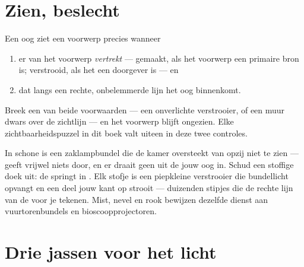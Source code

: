 \section{Zien, beslecht}

\begin{proposition}\label{prop:g7:light-sources-propagation:vision}
Een oog ziet een voorwerp precies wanneer
\begin{enumerate}
  \item er  van het voorwerp \emph{vertrekt} --- gemaakt, als
        het voorwerp een primaire bron is; verstrooid, als het een
        doorgever is --- en
  \item dat  langs een rechte, onbelemmerde lijn het oog
        binnenkomt.
\end{enumerate}
Breek een van beide voorwaarden --- een onverlichte verstrooier, of
een muur dwars over de zichtlijn --- en het voorwerp blijft ongezien.
Elke zichtbaarheidspuzzel in dit boek valt uiteen in deze twee
controles.
\end{proposition}

\begin{example}\label{ex:g7:light-sources-propagation:beam}
In schone  is een zaklampbundel die de kamer oversteekt van
opzij niet te zien ---  geeft vrijwel niets door, en er draait
geen  uit de  jouw oog in. Schud een stoffige doek uit:
de  springt in . Elk stofje is een piepkleine verstrooier
die bundellicht opvangt en een deel jouw kant op strooit --- duizenden
stipjes die de rechte lijn van de  voor je tekenen. Mist, nevel
en rook bewijzen dezelfde dienst aan vuurtorenbundels en
bioscoopprojectoren.
\end{example}

\section{Drie jassen voor het licht}

